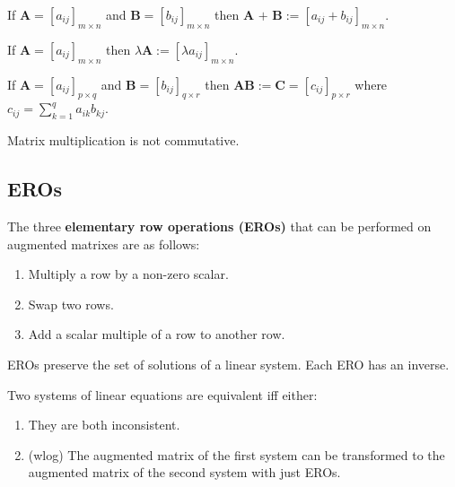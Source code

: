 \begin{definition}
    If $\textbf{A} = [a_{ij}]_{m\times n}$ and $\textbf{B} = [b_{ij}]_{m\times n}$ then $\textbf{A + B} := [a_{ij} + b_{ij}]_{m\times n}$.
\end{definition}

\begin{definition}
    If $\textbf{A} = [a_{ij}]_{m\times n}$ then $\lambda\textbf{A} := [\lambda a_{ij}]_{m\times n}$.
\end{definition}

\begin{definition}
    If $\textbf{A} = [a_{ij}]_{p\times q}$ and $\textbf{B} = [b_{ij}]_{q\times r}$ then $\textbf{AB} := \textbf{C} = [c_{ij}]_{p\times r}$ where $c_{ij} = \sum\limits_{k=1}^qa_{ik}b_{kj}$.
\end{definition}

\begin{remark}
    Matrix multiplication is not commutative.
\end{remark}

\subsection{EROs}
\begin{definition}
    The three \textbf{elementary row operations (EROs)} that can be performed on augmented matrixes are as follows:
    \begin{enumerate}
        \item Multiply a row by a non-zero scalar.
        \item Swap two rows.
        \item Add a scalar multiple of a row to another row.
    \end{enumerate}
\end{definition}

\begin{remark}
    EROs preserve the set of solutions of a linear system. Each ERO has an inverse.
\end{remark}

\begin{definition}
    Two systems of linear equations are equivalent iff either:
    \begin{enumerate}
        \item They are both inconsistent.
        \item (wlog) The augmented matrix of the first system can be transformed to the augmented matrix of the second system with just EROs.
    \end{enumerate}
\end{definition}

